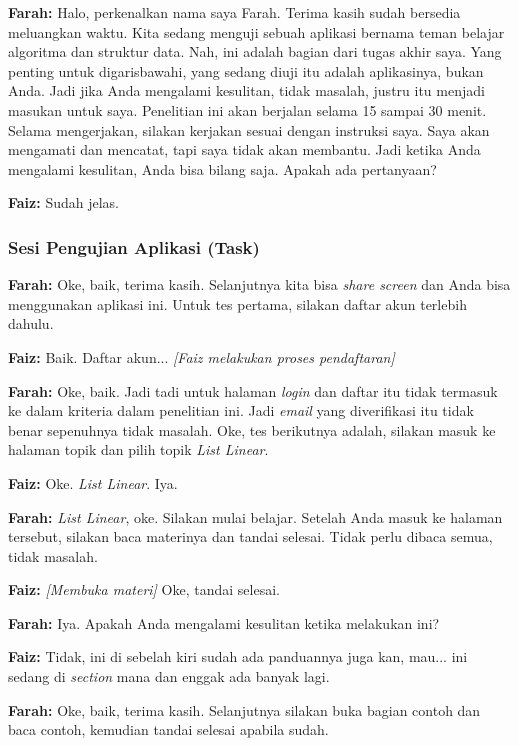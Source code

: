 \textbf{Farah:} Halo, perkenalkan nama saya Farah. Terima kasih sudah bersedia meluangkan waktu. Kita sedang menguji sebuah aplikasi bernama teman belajar algoritma dan struktur data. Nah, ini adalah bagian dari tugas akhir saya. Yang penting untuk digarisbawahi, yang sedang diuji itu adalah aplikasinya, bukan Anda. Jadi jika Anda mengalami kesulitan, tidak masalah, justru itu menjadi masukan untuk saya. Penelitian ini akan berjalan selama 15 sampai 30 menit. Selama mengerjakan, silakan kerjakan sesuai dengan instruksi saya. Saya akan mengamati dan mencatat, tapi saya tidak akan membantu. Jadi ketika Anda mengalami kesulitan, Anda bisa bilang saja. Apakah ada pertanyaan?

\textbf{Faiz:} Sudah jelas.

\subsubsection*{Sesi Pengujian Aplikasi (Task)}

\textbf{Farah:} Oke, baik, terima kasih. Selanjutnya kita bisa \textit{share screen} dan Anda bisa menggunakan aplikasi ini. Untuk tes pertama, silakan daftar akun terlebih dahulu.

\textbf{Faiz:} Baik. Daftar akun... \textit{[Faiz melakukan proses pendaftaran]}

\textbf{Farah:} Oke, baik. Jadi tadi untuk halaman \textit{login} dan daftar itu tidak termasuk ke dalam kriteria dalam penelitian ini. Jadi \textit{email} yang diverifikasi itu tidak benar sepenuhnya tidak masalah. Oke, tes berikutnya adalah, silakan masuk ke halaman topik dan pilih topik \textit{List Linear}.

\textbf{Faiz:} Oke. \textit{List Linear}. Iya.

\textbf{Farah:} \textit{List Linear}, oke. Silakan mulai belajar. Setelah Anda masuk ke halaman tersebut, silakan baca materinya dan tandai selesai. Tidak perlu dibaca semua, tidak masalah.

\textbf{Faiz:} \textit{[Membuka materi]} Oke, tandai selesai.

\textbf{Farah:} Iya. Apakah Anda mengalami kesulitan ketika melakukan ini?

\textbf{Faiz:} Tidak, ini di sebelah kiri sudah ada panduannya juga kan, mau... ini sedang di \textit{section} mana dan enggak ada banyak lagi.

\textbf{Farah:} Oke, baik, terima kasih. Selanjutnya silakan buka bagian contoh dan baca contoh, kemudian tandai selesai apabila sudah.

